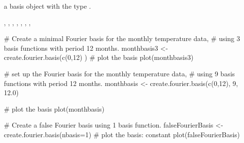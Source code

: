\begin{Value}
a basis object with the type .
\end{Value}
\begin{SeeAlso}\relax
{},
,
,
,
,
,
,
\end{SeeAlso}
\begin{Examples}
\begin{ExampleCode}
# Create a minimal Fourier basis for the monthly temperature data,
#  using 3 basis functions with period 12 months.
monthbasis3 <- create.fourier.basis(c(0,12) )
#  plot the basis
plot(monthbasis3)

# set up the Fourier basis for the monthly temperature data,
#  using 9 basis functions with period 12 months.
monthbasis <- create.fourier.basis(c(0,12), 9, 12.0)

#  plot the basis
plot(monthbasis)

# Create a false Fourier basis using 1 basis function.
falseFourierBasis <- create.fourier.basis(nbasis=1)
#  plot the basis:  constant
plot(falseFourierBasis)

\end{ExampleCode}
\end{Examples}

